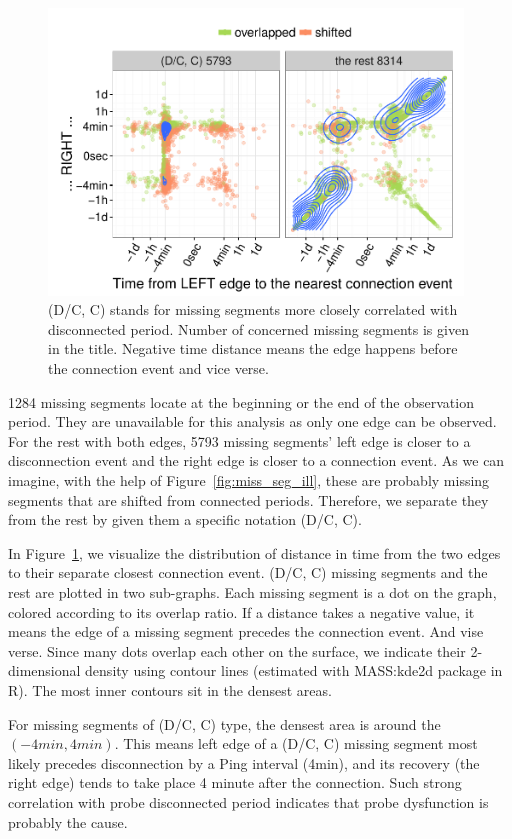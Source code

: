 \begin{figure}[!htb]
\centering
\includegraphics[width=0.98\textwidth]{gfx/chap3/all.pdf}
\caption{(D/C, C) stands for missing segments more closely correlated with disconnected period.
Number of concerned missing segments is given in the title. Negative time distance means the edge happens before the connection event and vice verse.}
\label{fig:all}
\end{figure}

1284 missing segments locate at the beginning or the end of the observation period. 
They are unavailable for this analysis as only one edge can be observed.
For the rest with both edges, 5793 missing segments' left edge is closer to a disconnection event and the right edge is closer to a connection event.
As we can imagine, with the help of Figure~\ref{fig:miss_seg_ill}, these are probably missing segments that are shifted from connected periods.
Therefore, we separate they from the rest by given them a specific notation (D/C, C).

In Figure~\ref{fig:all}, we visualize the distribution of distance in time from the two edges to their separate closest connection event. 
(D/C, C) missing segments and the rest are plotted in two sub-graphs.
Each missing segment is a dot on the graph, colored according to its overlap ratio.
If a distance takes a negative value, it means the edge of a missing segment precedes the connection event.
And vise verse.
Since many dots overlap each other on the surface, we indicate their 2-dimensional density using contour lines (estimated with MASS:kde2d package in R). 
The most inner contours sit in the densest areas.

For missing segments of (D/C, C) type, the densest area is around the $(-4min, 4min)$. 
This means left edge of a (D/C, C) missing segment most likely precedes disconnection by a Ping interval (4min), and its recovery (the right edge) tends to take place 4 minute after the connection.
Such strong correlation with probe disconnected period indicates that probe dysfunction is probably the cause.

